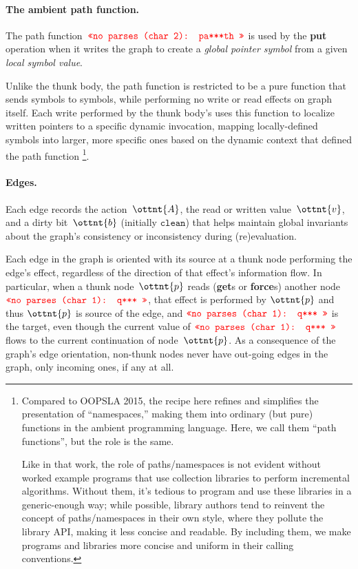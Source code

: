 \documentclass[11pt]{article}
\renewcommand{\ottkw}[1]{\mathtt{#1}}
\begin{document}
\paragraph{The ambient path function.}
%
The path function~$\texttt{\textcolor{red}{<<no parses (char 2): pa***th >>}}$ is used by the \textbf{put} operation when it writes
the graph to create a \emph{global pointer symbol} from a given
\emph{local symbol value}.

Unlike the thunk body, the path function is restricted to be a pure
function that sends symbols to symbols, while performing no write or
read effects on graph itself.
%
Each write performed by the thunk body's uses this function to
localize written pointers to a specific dynamic invocation, mapping
locally-defined symbols into larger, more specific ones based on the
dynamic context that defined the path function
\footnote{
Compared to OOPSLA 2015, the recipe here refines and simplifies the
presentation of ``namespaces,'' making them into ordinary (but pure)
functions in the ambient programming language.
%
Here, we call them ``path functions'', but the role is the same.

Like in that work, the role of paths/namespaces is not evident without
worked example programs that use collection libraries to perform
incremental algorithms.
%
Without them, it's tedious to program and use these libraries in a
generic-enough way; while possible, library authors tend to reinvent
the concept of paths/namespaces in their own style, where they pollute the
library API, making it less concise and readable.
%
By including them, we make programs and libraries more concise and
uniform in their calling conventions.
}.


\paragraph{Edges.}
%
Each edge records the action~$\ottnt{A}$, the read or
written value~$\ottnt{v}$, and a dirty bit~$\ottnt{b}$ (initially $\ottkw{clean}$)
that helps maintain global invariants about the graph's consistency or
inconsistency during (re)evaluation.

Each edge in the graph is oriented with its source at a thunk node
performing the edge's effect, regardless of the direction of that
effect's information flow.
%
In particular, when a thunk node~$\ottnt{p}$ reads (\textbf{get}s or
\textbf{force}s) another node~$\texttt{\textcolor{red}{<<no parses (char 1): q*** >>}}$, that effect is performed by
$\ottnt{p}$ and thus $\ottnt{p}$ is source of the edge, and $\texttt{\textcolor{red}{<<no parses (char 1): q*** >>}}$ is the
target, even though the current value of $\texttt{\textcolor{red}{<<no parses (char 1): q*** >>}}$ flows to the current
continuation of node~$\ottnt{p}$.
%
As a consequence of the graph's edge orientation, non-thunk nodes
never have out-going edges in the graph, only incoming ones, if any at
all.
\end{document}

